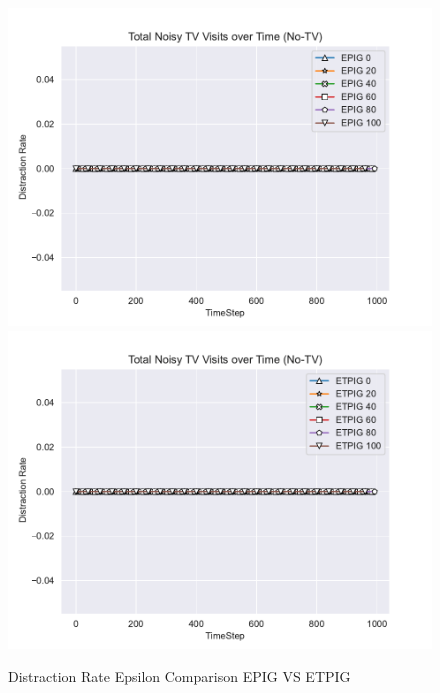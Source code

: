 \documentclass[12pt]{thesis}
\begin{document}
\begin{figure}[p]
	\includegraphics[scale=0.5]{"images/Epsilon_Distractions_EPIG_No-TV.pdf"}
	\includegraphics[scale=0.5]{"images/Epsilon_Distractions_ETPIG_No-TV.pdf"}
	\caption{Distraction Rate Epsilon Comparison EPIG VS ETPIG}
	\label{Fig:DREC}
	
	
	
\end{figure}
\end{document}
